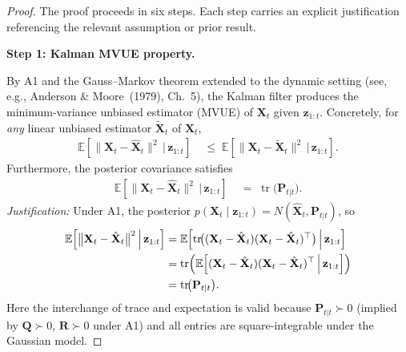 \documentclass[12pt,openany]{book}
\numberwithin{equation}{chapter}
\theoremstyle{plain}
\theoremstyle{definition}
\theoremstyle{remark}
\DeclareMathOperator{\tr}{tr}
\def\mathcal#1{#1}%
\begin{document}
\begin{proof}
The proof proceeds in six steps.  Each step carries an explicit
justification referencing the relevant assumption or prior result.

\medskip
\noindent\textbf{Step 1: Kalman MVUE property.}

By A1 and the Gauss--Markov theorem extended to the dynamic
setting (see, e.g., Anderson \& Moore~(1979), Ch.~5), the Kalman
filter produces the minimum-variance unbiased estimator (MVUE) of
$\mathbf{X}_t$ given $\mathbf{z}_{1:t}$.  Concretely, for
\emph{any} linear unbiased estimator $\tilde{\mathbf{X}}_t$ of
$\mathbf{X}_t$,
\begin{align}
  \mathbb{E}\!\left[
    \bigl\|\mathbf{X}_t - \hat{\mathbf{X}}_t\bigr\|^2
    \,\Big|\, \mathbf{z}_{1:t}
  \right]
  &\;\le\;
  \mathbb{E}\!\left[
    \bigl\|\mathbf{X}_t - \tilde{\mathbf{X}}_t\bigr\|^2
    \,\Big|\, \mathbf{z}_{1:t}
  \right].
  \label{eq:mvue-ineq}
\end{align}
Furthermore, the posterior covariance satisfies
\begin{align}
  \mathbb{E}\!\left[
    \bigl\|\mathbf{X}_t - \hat{\mathbf{X}}_t\bigr\|^2
    \,\Big|\, \mathbf{z}_{1:t}
  \right]
  &\;=\; \tr\!\bigl(\mathbf{P}_{t|t}\bigr).
  \label{eq:mse-equals-trace}
\end{align}
\emph{Justification:} Under A1, the posterior
$p(\mathbf{X}_t\mid\mathbf{z}_{1:t})
= \mathcal{N}(\hat{\mathbf{X}}_t,\mathbf{P}_{t|t})$,
so
\begin{align}
  \mathbb{E}\!\left[
    \bigl\|\mathbf{X}_t - \hat{\mathbf{X}}_t\bigr\|^2
    \,\Big|\, \mathbf{z}_{1:t}
  \right]
  &= \mathbb{E}\!\left[
       \tr\!\bigl(
         (\mathbf{X}_t - \hat{\mathbf{X}}_t)
         (\mathbf{X}_t - \hat{\mathbf{X}}_t)^\top
       \bigr)
       \,\Big|\, \mathbf{z}_{1:t}
     \right] \notag\\
  &= \tr\!\left(
       \mathbb{E}\!\left[
         (\mathbf{X}_t - \hat{\mathbf{X}}_t)
         (\mathbf{X}_t - \hat{\mathbf{X}}_t)^\top
         \,\Big|\, \mathbf{z}_{1:t}
       \right]
     \right) \notag\\
  &= \tr\!\bigl(\mathbf{P}_{t|t}\bigr).
  \label{eq:mse-trace-derivation}
\end{align}
Here the interchange of trace and expectation is valid because
$\mathbf{P}_{t|t}\succ 0$ (implied by $\mathbf{Q}\succ 0$,
$\mathbf{R}\succ 0$ under A1) and all entries are square-integrable
under the Gaussian model.


\end{proof}
\end{document}
